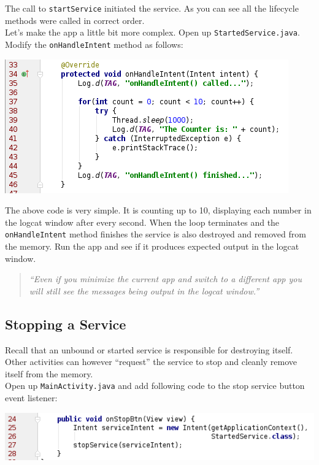 The call to \texttt{startService} initiated the service. As you can see all the lifecycle methods were called in correct order. \\

Let's make the app a little bit more complex. Open up \texttt{StartedService.java}. Modify the \texttt{onHandleIntent} method as follows:

\begin{center}
	\includegraphics[scale=\SourceCodeScale]{chapters/ch14/images/12}
\end{center}

The above code is very simple. It is counting up to 10, displaying each number in the logcat window after every second. When the loop terminates and the \texttt{onHandleIntent} method finishes the service is also destroyed and removed from the memory. Run the app and see if it produces expected output in the logcat window.

\begin{quote}
	\textit{``Even if you minimize the current app and switch to a different app you will still see the messages being output in the logcat window.''}
\end{quote}


\subsection{Stopping a Service}
\label{TAS:stoppingService}
Recall that an unbound or started service is responsible for destroying itself. Other activities can however ``request'' the service to stop and cleanly remove itself from the memory. \\

Open up \texttt{MainActivity.java} and add following code to the stop service button event listener:

\begin{center}
	\includegraphics[scale=\SourceCodeScale]{chapters/ch14/images/13}
\end{center}

